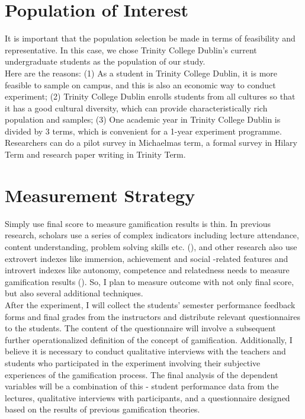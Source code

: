 \documentclass[12pt]{article} %
\begin{document}
\section*{Population of Interest}
\noindent It is important that the population selection be made in terms of feasibility and representative. In this case, we chose Trinity College Dublin's current undergraduate students as the population of our study.\\

\noindent Here are the reasons: (1) As a student in Trinity College Dublin, it is more feasible to sample on campus, and this is also an economic way to conduct experiment; (2)  Trinity College Dublin enrolls students from all cultures so that it has a good cultural diversity, which can provide characteristically rich population and samples; (3) One academic year in Trinity College Dublin is divided by 3 terms, which is convenient for a 1-year experiment programme. Researchers can do a pilot survey in Michaelmas term, a formal survey in Hilary Term and research paper writing in Trinity Term.\\

\section*{Measurement Strategy}
\noindent Simply use final score to measure gamification results is thin. In previous research, scholars use a series of complex indicators including lecture attendance, content understanding, problem solving skills etc. (\cite{o2013case}), and other research also use extrovert indexes like immersion, achievement and social -related features and introvert indexes like autonomy, competence and relatedness needs to measure gamification results (\cite{xi2019does}). So, I plan to measure outcome with not only final score, but also several additional techniques.\\

\noindent After the experiment, I will collect the students' semester performance feedback forms and final grades from the instructors and distribute relevant questionnaires to the students. The content of the questionnaire will involve a subsequent further operationalized definition of the concept of gamification. Additionally, I believe it is necessary to conduct qualitative interviews with the teachers and students who participated in the experiment involving their subjective experiences of the gamification process. The final analysis of the dependent variables will be a combination of this - student performance data from the lectures, qualitative interviews with participants, and a questionnaire designed based on the results of previous gamification theories.\\
\end{document}
